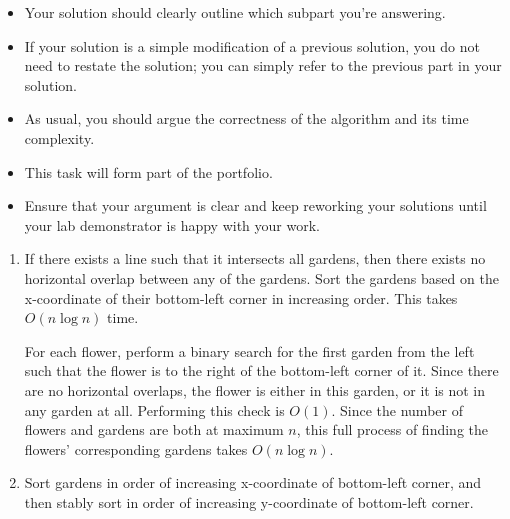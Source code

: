 \documentclass{article}
\begin{document}
\begin{rubric}
\begin{itemize}
    \item Your solution should clearly outline which subpart you're answering.

    \item If your solution is a simple modification of a previous solution, you do not need to restate the solution; you can simply refer to the previous part in your solution.

    \item As usual, you should argue the correctness of the algorithm and its time complexity.

    \item This task will form part of the portfolio.
    \item Ensure that your argument is clear and keep reworking your solutions until your lab demonstrator is happy with your work.
\end{itemize}
\end{rubric}

\begin{solution}
\begin{enumerate}[label = (\alph*)]
    \item If there exists a line such that it intersects all gardens, then there exists no horizontal overlap between any of the gardens.
    Sort the gardens based on the x-coordinate of their bottom-left corner in increasing order. This takes $O(n\log n)$ time.
    
    For each flower, perform a binary search for the first garden from the left such that the flower is to the right of the bottom-left corner of it.
    Since there are no horizontal overlaps, the flower is either in this garden, or it is not in any garden at all. Performing this check is $O(1)$.
    Since the number of flowers and gardens are both at maximum $n$, this full process of finding the flowers' corresponding gardens takes $O(n\log n)$.

    \item Sort gardens in order of increasing x-coordinate of bottom-left corner, and then stably sort in order of increasing y-coordinate of bottom-left corner.
\end{enumerate}
\end{solution}
\end{document}
